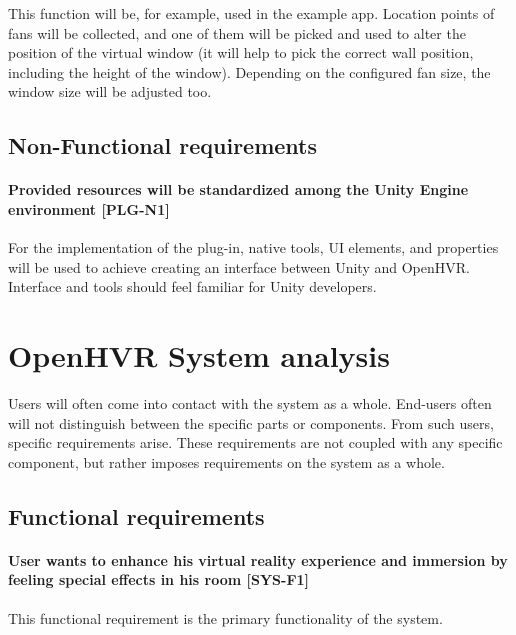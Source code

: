 This function will be, for example, used in the example app. Location points of
fans will be collected, and one of them will be picked and used to alter
the position of the virtual window (it will help to pick the correct wall position,
including the height of the window). Depending on the configured fan size,
the window size will be adjusted too.


\hypertarget{x-non-functional-requirements}{\subsection{Non-Functional requirements}}
\hypertarget{x-\textbf{provided-resources-will-be-standardized-among-the-unity-engine-environment}-[plg-n1]}{\paragraph*{\textbf{Provided resources will be standardized among the Unity Engine environment} [PLG-N1]}}
For the implementation of the plug-in, native tools, UI elements, and properties
will be used to achieve creating an interface between Unity and OpenHVR.
Interface and tools should feel familiar for Unity developers.


\hypertarget{x-openhvr-system-analysis}{\section{OpenHVR System analysis}}
Users will often come into contact with the system as a whole. End-users
often will not distinguish between the specific parts or components. From such
users, specific requirements arise. These requirements are not coupled with
any specific component, but rather imposes requirements on the system as a whole.


\hypertarget{x-functional-requirements}{\subsection{Functional requirements}}
\hypertarget{x-\textbf{user-wants-to-enhance-his-virtual-reality-experience-and-immersion-by-feeling-special-effects-in-his-room}-[sys-f1]}{\paragraph*{\textbf{User wants to enhance his virtual reality experience and immersion by feeling special effects in his room} [SYS-F1]}}
This functional requirement is the primary functionality of the system.


